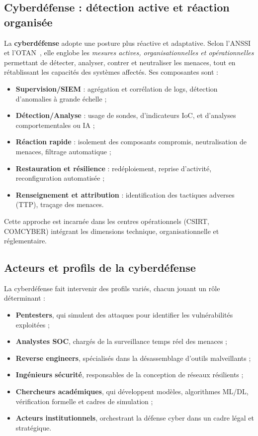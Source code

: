 \documentclass[ twoside,openright,titlepage,numbers=noenddot,headinclude,%
                footinclude=true,cleardoublepage=empty,abstractoff, %
                BCOR=5mm,paper=a4,fontsize=11pt,%
                french,american,%
                ]{scrreprt}
\begin{document}
\subsection*{Cyberdéfense : détection active et réaction organisée}

La \textbf{cyberdéfense} adopte une posture plus réactive et adaptative. Selon l'ANSSI et l'OTAN~\cite{ANSSI2020,NATO2016Cyberdef}, elle englobe les \emph{mesures actives, organisationnelles et opérationnelles} permettant de détecter, analyser, contrer et neutraliser les menaces, tout en rétablissant les capacités des systèmes affectés. Ses composantes sont :
\begin{itemize}
    \item \textbf{Supervision/SIEM} : agrégation et corrélation de logs, détection d'anomalies à grande échelle ;
    \item \textbf{Détection/Analyse} : usage de sondes, d'indicateurs IoC, et d'analyses comportementales ou IA ;
    \item \textbf{Réaction rapide} : isolement des composants compromis, neutralisation de menaces, filtrage automatique ;
    \item \textbf{Restauration et résilience} : redéploiement, reprise d'activité, reconfiguration automatisée ;
    \item \textbf{Renseignement et attribution} : identification des tactiques adverses (TTP), traçage des menaces.
\end{itemize}
Cette approche est incarnée dans les centres opérationnels (CSIRT, COMCYBER) intégrant les dimensions technique, organisationnelle et réglementaire.

\subsection*{Acteurs et profils de la cyberdéfense}

La cyberdéfense fait intervenir des profils variés, chacun jouant un rôle déterminant :
\begin{itemize}
    \item \textbf{Pentesters}, qui simulent des attaques pour identifier les vulnérabilités exploitées ;
    \item \textbf{Analystes SOC}, chargés de la surveillance temps réel des menaces ;
    \item \textbf{Reverse engineers}, spécialisés dans la désassemblage d'outils malveillants ;
    \item \textbf{Ingénieurs sécurité}, responsables de la conception de réseaux résilients ;
    \item \textbf{Chercheurs académiques}, qui développent modèles, algorithmes ML/DL, vérification formelle et cadres de simulation ;
    \item \textbf{Acteurs institutionnels}, orchestrant la défense cyber dans un cadre légal et stratégique.
\end{itemize}
\end{document}
